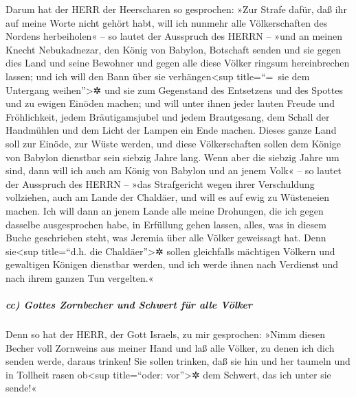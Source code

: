 Darum hat der HERR der Heerscharen so gesprochen: »Zur
Strafe dafür, daß ihr auf meine Worte nicht gehört habt,
will ich nunmehr alle Völkerschaften des Nordens
herbeiholen« -- so lautet der Ausspruch des HERRN -- »und an meinen
Knecht Nebukadnezar, den König von Babylon, Botschaft senden und sie
gegen dies Land und seine Bewohner und gegen alle diese Völker ringsum
hereinbrechen lassen; und ich will den Bann über sie
verhängen\textless sup title=``=~sie dem Untergang weihen''\textgreater✲
und sie zum Gegenstand des Entsetzens und des Spottes und zu ewigen
Einöden machen; und will unter ihnen jeder lauten Freude
und Fröhlichkeit, jedem Bräutigamsjubel und jedem Brautgesang, dem
Schall der Handmühlen und dem Licht der Lampen ein Ende machen.
Dieses ganze Land soll zur Einöde, zur Wüste werden, und
diese Völkerschaften sollen dem Könige von Babylon dienstbar sein
siebzig Jahre lang. Wenn aber die siebzig Jahre um sind,
dann will ich auch am König von Babylon und an jenem Volk« -- so lautet
der Ausspruch des HERRN -- »das Strafgericht wegen ihrer Verschuldung
vollziehen, auch am Lande der Chaldäer, und will es auf ewig zu
Wüsteneien machen. Ich will dann an jenem Lande alle
meine Drohungen, die ich gegen dasselbe ausgesprochen habe, in Erfüllung
gehen lassen, alles, was in diesem Buche geschrieben steht, was Jeremia
über alle Völker geweissagt hat. Denn sie\textless sup
title=``d.h. die Chaldäer''\textgreater✲ sollen gleichfalls mächtigen
Völkern und gewaltigen Königen dienstbar werden, und ich werde ihnen
nach Verdienst und nach ihrem ganzen Tun vergelten.«

\hypertarget{cc-gottes-zornbecher-und-schwert-fuxfcr-alle-vuxf6lker}{%
\subparagraph{cc) Gottes Zornbecher und Schwert für alle
Völker}\label{cc-gottes-zornbecher-und-schwert-fuxfcr-alle-vuxf6lker}}

Denn so hat der HERR, der Gott Israels, zu mir
gesprochen: »Nimm diesen Becher voll Zornweins aus meiner Hand und laß
alle Völker, zu denen ich dich senden werde, daraus trinken!
Sie sollen trinken, daß sie hin und her taumeln und in
Tollheit rasen ob\textless sup title=``oder: vor''\textgreater✲ dem
Schwert, das ich unter sie sende!«

